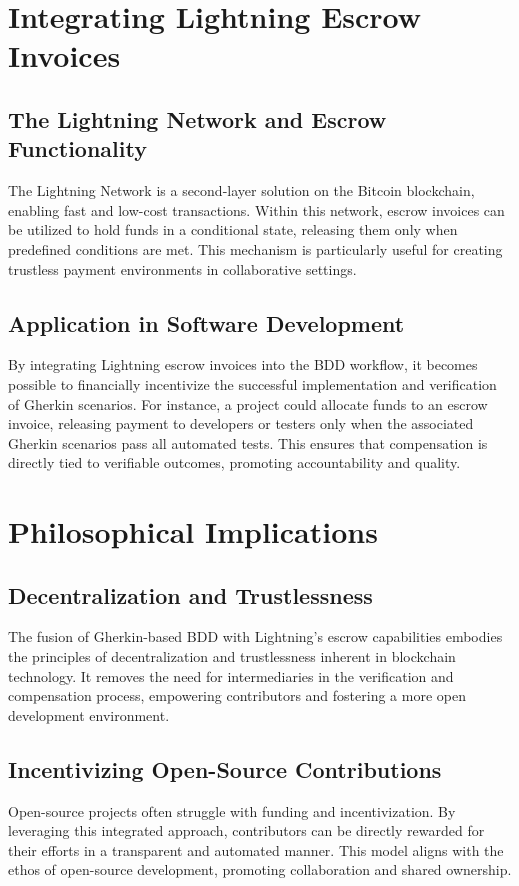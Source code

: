 \documentclass[12pt]{article}
\begin{document}
\section*{Integrating Lightning Escrow Invoices}
\subsection*{The Lightning Network and Escrow Functionality}
The Lightning Network is a second-layer solution on the Bitcoin blockchain, enabling fast and low-cost transactions. Within this network, escrow invoices can be utilized to hold funds in a conditional state, releasing them only when predefined conditions are met. This mechanism is particularly useful for creating trustless payment environments in collaborative settings.

\subsection*{Application in Software Development}
By integrating Lightning escrow invoices into the BDD workflow, it becomes possible to financially incentivize the successful implementation and verification of Gherkin scenarios. For instance, a project could allocate funds to an escrow invoice, releasing payment to developers or testers only when the associated Gherkin scenarios pass all automated tests. This ensures that compensation is directly tied to verifiable outcomes, promoting accountability and quality.

\section*{Philosophical Implications}
\subsection*{Decentralization and Trustlessness}
The fusion of Gherkin-based BDD with Lightning's escrow capabilities embodies the principles of decentralization and trustlessness inherent in blockchain technology. It removes the need for intermediaries in the verification and compensation process, empowering contributors and fostering a more open development environment.

\subsection*{Incentivizing Open-Source Contributions}
Open-source projects often struggle with funding and incentivization. By leveraging this integrated approach, contributors can be directly rewarded for their efforts in a transparent and automated manner. This model aligns with the ethos of open-source development, promoting collaboration and shared ownership.
\end{document}
